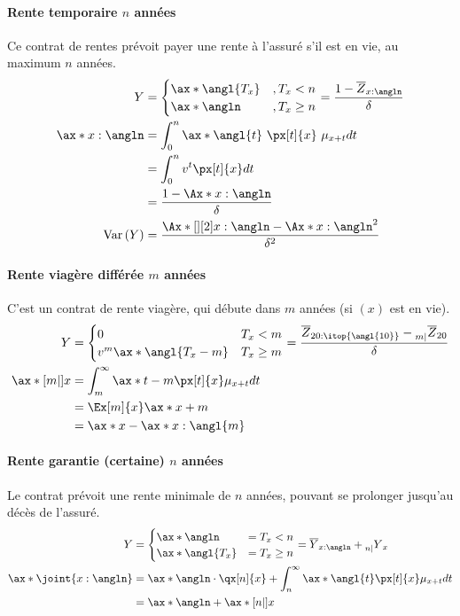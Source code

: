 \documentclass[10pt, french]{article}
\begin{document}
\begin{multicols*}{3}
\paragraph{Rente temporaire $n$ années} Ce contrat de rentes prévoit payer une rente à l'assuré s'il est en vie, au maximum $n$ années.
\begin{align*}
Y & = \begin{cases}
\ax*{\angl{T_x}}	& , T_x < n \\
\ax*{\angln}			& , T_x \geq n \\
\end{cases} = \frac{1  - \overline{Z}_{x:\angln}}{\delta} \\
\ax*{x:\angln}	& = \int_{0}^{n} \ax*{\angl{t}} \  \px[t]{x} \  \mu_{x+t} dt \\
	& = \int_{0}^{n} v^t \px[t]{x} dt \\
	& = \frac{1 - \Ax*{x:\angln}}{\delta} \\
\variance{Y}	& = \frac{\Ax*[][2]{x:\angln} - \Ax*{x:\angln}^2}{\delta^2} \\	
 \end{align*}

\paragraph{Rente viagère différée $m$ années} C'est un contrat de rente viagère, qui débute dans $m$ années (si $(x)$ est en vie).
\begin{align*}
Y & = \begin{cases}
0											& T_x	 < 	 m	\\
v^m \ax*{\angl{T_x - m}}	& T_x 	\geq m	\\
\end{cases} = \frac{\overline{Z}_{20:\itop{\angl{10}}} - \prescript{}{m|}{\overline{Z}}_{20}}{\delta} \\ 
\ax*[m|]{x}	& = \int_{m}^{\infty} \ax*{t-m} \px[t]{x} \mu_{x+t} dt \\
	& = \Ex[m]{x} \ax*{x+m} \\
	& = \ax*{x} - \ax*{x:\angl{m}} \\
\end{align*}

\paragraph{Rente garantie (certaine) $n$ années} Le contrat prévoit une rente minimale de $n$ années, pouvant se prolonger jusqu'au décès de l'assuré.
\begin{align*}
Y & = \begin{cases}
\ax*{\angln}	& = T_x < n \\
\ax*{\angl{T_x}}	& = T_x \geq n \\
\end{cases} = \overline{Y}_{x:\angln} + \prescript{}{n|}{Y}_x \\
\ax*{\joint{x:\angln}}	& =\ax*{\angln} \cdot \qx[n]{x} + \int_{n}^{\infty} \ax*{\angl{t}} \px[t]{x} \mu_{x+t} dt \\
	& = \ax*{\angln} + \ax*[n|]{x} \\
\end{align*}


\end{multicols*}
\end{document}
